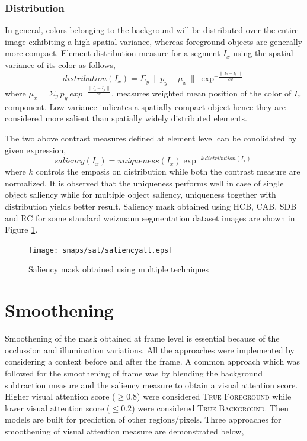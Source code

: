 \subsubsection{Distribution}
In general, colors belonging to the background will be distributed over the entire image exhibiting a high spatial variance, whereas foreground objects are generally more compact. Element distribution measure for a segment $I_{x}$ using the spatial variance of its color as follows,
$$distribution(I_{x}) = \Sigma_{y} \parallel~p_{y} -\mu_{x}~\parallel~\exp^{-\frac{\parallel~I_{x} - I_{y}~\parallel}{cw}}$$ 
where $\mu_{x} = \Sigma_{y}~p_{y}~exp^{-\frac{\parallel~I_{x} - I_{y}~\parallel}{cw}}$, measures weighted mean position of the color of $I_{x}$ component. Low variance indicates a spatially compact object hence they are considered more salient than spatially widely distributed elements.

\par The two above contrast measures defined at element level can be conolidated by given expression,
$$saliency(I_{x}) = uniqueness(I_{x}) \exp^{-k~distribution(I_{x})}$$
where $k$ controls the empasis on distribution while both the contrast measure are normalized. It is observed that the uniqueness performs well in case of single object saliency while for multiple object saliency, uniqueness together with distribution yields better result. Saliency mask obtained using HCB, CAB, SDB and RC for some standard weizmann segmentation dataset images are shown in Figure \ref{fig:sal}. 

\begin{figure}[htpb]
   \begin{center}
	    \texttt{[image: snaps/sal/saliencyall.eps]}     
     \caption {Saliency mask obtained using multiple techniques}
   \label{fig:sal}
   \end{center}
 \end{figure}

 \section{Smoothening}
Smoothening of the mask obtained at frame level is essential because of the occlussion and illumination variations. All the approaches were implemented by considering a context before and after the frame. A common approach which was followed for the smoothening of frame was by blending the background subtraction measure and the saliency measure to obtain a visual attention score. Higher visual attention score ($\geqslant0.8$) were considered \textsc{True Foreground} while lower visual attention score ($\leqslant0.2$)  were considered \textsc{True Background}. Then models are built for prediction of other regions/pixels. Three approaches for smoothening of visual attention measure are demonstrated below,
